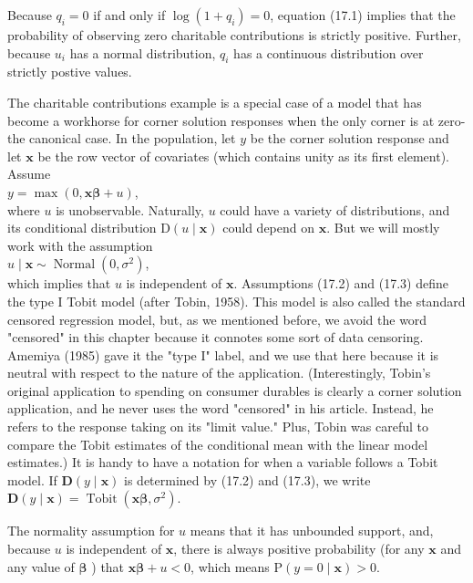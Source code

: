 \documentclass[10pt]{article}
\begin{document}
Because $q_{i}=0$ if and only if $\log \left(1+q_{i}\right)=0$, equation (17.1) implies that the probability of observing zero charitable contributions is strictly positive. Further, because $u_{i}$ has a normal distribution, $q_{i}$ has a continuous distribution over strictly postive values.

The charitable contributions example is a special case of a model that has become a workhorse for corner solution responses when the only corner is at zero-the canonical case. In the population, let $y$ be the corner solution response and let $\mathbf{x}$ be the row vector of covariates (which contains unity as its first element). Assume\\
$y=\max (0, \mathbf{x} \boldsymbol{\beta}+u)$,\\
where $u$ is unobservable. Naturally, $u$ could have a variety of distributions, and its conditional distribution $\mathrm{D}(u \mid \mathbf{x})$ could depend on $\mathbf{x}$. But we will mostly work with the assumption\\
$u \mid \mathbf{x} \sim \operatorname{Normal}\left(0, \sigma^{2}\right)$,\\
which implies that $u$ is independent of $\mathbf{x}$. Assumptions (17.2) and (17.3) define the type I Tobit model (after Tobin, 1958). This model is also called the standard censored regression model, but, as we mentioned before, we avoid the word "censored" in this chapter because it connotes some sort of data censoring. Amemiya (1985) gave it the "type I" label, and we use that here because it is neutral with respect to the nature of the application. (Interestingly, Tobin's original application to spending on consumer durables is clearly a corner solution application, and he never uses the word "censored" in his article. Instead, he refers to the response taking on its "limit value." Plus, Tobin was careful to compare the Tobit estimates of the conditional mean with the linear model estimates.) It is handy to have a notation for when a variable follows a Tobit model. If $\mathbf{D}(y \mid \mathbf{x})$ is determined by (17.2) and (17.3), we write $\mathbf{D}(y \mid \mathbf{x})= \operatorname{Tobit}\left(\mathbf{x} \boldsymbol{\beta}, \sigma^{2}\right)$.

The normality assumption for $u$ means that it has unbounded support, and, because $u$ is independent of $\mathbf{x}$, there is always positive probability (for any $\mathbf{x}$ and any value of $\boldsymbol{\beta}$ ) that $\mathbf{x} \boldsymbol{\beta}+u<0$, which means $\mathrm{P}(y=0 \mid \mathbf{x})>0$.
\end{document}
